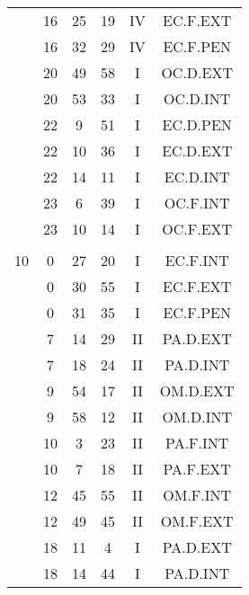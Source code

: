 \documentclass[12pt, a4paper]{article}
\begin{document}
\begin{multicols}{3}
{\begin{tabular}{c c c c c c}
	 	 	 	 & 16 & 25 & 19 & IV & EC.F.EXT\\%
	 	 	 	 & 16 & 32 & 29 & IV & EC.F.PEN\\%
	 	 	 	 & 20 & 49 & 58 & I & OC.D.EXT\\%
	 	 	 	 & 20 & 53 & 33 & I & OC.D.INT\\%
	 	 	 	 & 22 & 9 & 51 & I & EC.D.PEN\\%
	 	 	 	 & 22 & 10 & 36 & I & EC.D.EXT\\%
	 	 	 	 & 22 & 14 & 11 & I & EC.D.INT\\%
	 	 	 	 & 23 & 6 & 39 & I & OC.F.INT\\%
	 	 	 	 & 23 & 10 & 14 & I & OC.F.EXT\\%
	 	 	 	 & & & & & \\%
	 	 	 	10 & 0 & 27 & 20 & I & EC.F.INT\\%
	 	 	 	 & 0 & 30 & 55 & I & EC.F.EXT\\%
	 	 	 	 & 0 & 31 & 35 & I & EC.F.PEN\\%
	 	 	 	 & 7 & 14 & 29 & II & PA.D.EXT\\%
	 	 	 	 & 7 & 18 & 24 & II & PA.D.INT\\%
	 	 	 	 & 9 & 54 & 17 & II & OM.D.EXT\\%
	 	 	 	 & 9 & 58 & 12 & II & OM.D.INT\\%
	 	 	 	 & 10 & 3 & 23 & II & PA.F.INT\\%
	 	 	 	 & 10 & 7 & 18 & II & PA.F.EXT\\%
	 	 	 	 & 12 & 45 & 55 & II & OM.F.INT\\%
	 	 	 	 & 12 & 49 & 45 & II & OM.F.EXT\\%
	 	 	 	 & 18 & 11 & 4 & I & PA.D.EXT\\%
	 	 	 	 & 18 & 14 & 44 & I & PA.D.INT\\%

\end{tabular}}
\end{multicols}
\end{document}
